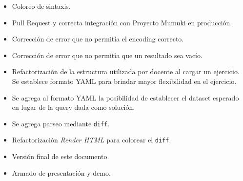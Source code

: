 \begin{itemize}
    \item Coloreo de sintaxis.
    \item Pull Request y correcta integración con Proyecto Mumuki en producción.
    \item Corrección de error que no permitía el encoding correcto.
    \item Corrección de error que no permitía que un resultado sea vacío.
    \item Refactorización de la estructura utilizada por docente al cargar un ejercicio.
    Se establece formato YAML para brindar mayor flexibilidad en el ejercicio.
    \item Se agrega al formato YAML la posibilidad de establecer el dataset
    esperado en lugar de la query dada como solución.
    \item Se agrega parseo mediante \texttt{diff}.
    \item Refactorización \textit{Render HTML} para colorear el \texttt{diff}.
    \item Versión final de este documento.
    \item Armado de presentación y demo.
\end{itemize}

